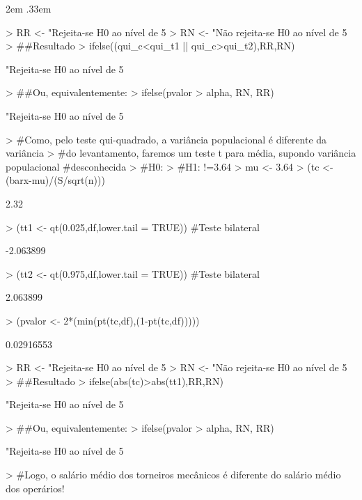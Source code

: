 \documentclass{article}
\newenvironment{ManualExercise}
  {\begin{list}{}{\leftmargin \QuestionIndent
    \partopsep0pt \parsep\parskip \topsep\QuestionBefore
    \itemsep\QuestionBefore \labelwidth2em
    \labelsep.33em
    \usecounter{Question}}}
  {\end{list}}
\begin{document}
\begin{Exercise}
\begin{ManualExercise}
\begin{Schunk}
\begin{Sinput}
> RR <- "Rejeita-se H0 ao nível de 5%
> RN <- "Não rejeita-se H0 ao nível de 5%
> ##Resultado
> ifelse((qui_c<qui_t1 || qui_c>qui_t2),RR,RN)
\end{Sinput}
\begin{Soutput}
[1] "Rejeita-se H0 ao nível de 5%
\end{Soutput}
\begin{Sinput}
> ##Ou, equivalentemente:
> ifelse(pvalor > alpha, RN, RR)
\end{Sinput}
\begin{Soutput}
[1] "Rejeita-se H0 ao nível de 5%
\end{Soutput}
\begin{Sinput}
> #Como, pelo teste qui-quadrado, a variância populacional é diferente da variância 
> #do levantamento, faremos um teste t para média, supondo variância populacional #desconhecida 
> #H0: 
> #H1: \mu!=3.64
> mu <- 3.64
> (tc <- (barx-mu)/(S/sqrt(n)))
\end{Sinput}
\begin{Soutput}
[1] 2.32
\end{Soutput}
\begin{Sinput}
> (tt1 <- qt(0.025,df,lower.tail = TRUE)) #Teste bilateral
\end{Sinput}
\begin{Soutput}
[1] -2.063899
\end{Soutput}
\begin{Sinput}
> (tt2 <- qt(0.975,df,lower.tail = TRUE)) #Teste bilateral
\end{Sinput}
\begin{Soutput}
[1] 2.063899
\end{Soutput}
\begin{Sinput}
> (pvalor <- 2*(min(pt(tc,df),(1-pt(tc,df)))))
\end{Sinput}
\begin{Soutput}
[1] 0.02916553
\end{Soutput}
\begin{Sinput}
> RR <- "Rejeita-se H0 ao nível de 5%
> RN <- "Não rejeita-se H0 ao nível de 5%
> ##Resultado
> ifelse(abs(tc)>abs(tt1),RR,RN)
\end{Sinput}
\begin{Soutput}
[1] "Rejeita-se H0 ao nível de 5%
\end{Soutput}
\begin{Sinput}
> ##Ou, equivalentemente:
> ifelse(pvalor > alpha, RN, RR)
\end{Sinput}
\begin{Soutput}
[1] "Rejeita-se H0 ao nível de 5%
\end{Soutput}
\begin{Sinput}
> #Logo, o salário médio dos torneiros mecânicos é diferente do salário médio dos operários!
\end{Sinput}
\end{Schunk}


\end{ManualExercise}
\end{Exercise}
\end{document}
